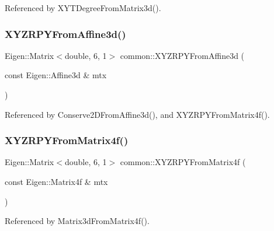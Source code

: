 Referenced by X\+Y\+T\+Degree\+From\+Matrix3d().

\mbox{\label{namespacecommon_abf63050ffc1423dd7c334a6c3c5618a1}} 
\subsubsection{\texorpdfstring{X\+Y\+Z\+R\+P\+Y\+From\+Affine3d()}{XYZRPYFromAffine3d()}}
{\footnotesize\ttfamily Eigen\+::\+Matrix$<$double, 6, 1$>$ common\+::\+X\+Y\+Z\+R\+P\+Y\+From\+Affine3d (\begin{DoxyParamCaption}\item[{const Eigen\+::\+Affine3d \&}]{mtx }\end{DoxyParamCaption})}



Referenced by Conserve2\+D\+From\+Affine3d(), and X\+Y\+Z\+R\+P\+Y\+From\+Matrix4f().

\mbox{\label{namespacecommon_a75012054387d4de49be04481e844d4aa}} 
\subsubsection{\texorpdfstring{X\+Y\+Z\+R\+P\+Y\+From\+Matrix4f()}{XYZRPYFromMatrix4f()}}
{\footnotesize\ttfamily Eigen\+::\+Matrix$<$double, 6, 1$>$ common\+::\+X\+Y\+Z\+R\+P\+Y\+From\+Matrix4f (\begin{DoxyParamCaption}\item[{const Eigen\+::\+Matrix4f \&}]{mtx }\end{DoxyParamCaption})}



Referenced by Matrix3d\+From\+Matrix4f().


